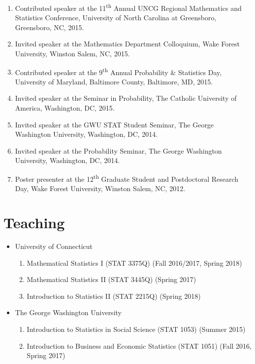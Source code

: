 \documentclass{res}
\begin{document}
\begin{resume}
\begin{enumerate}
	\item Contributed speaker at the 11\textsuperscript{th} Annual UNCG Regional Mathematics and Statistics Conference, University of North Carolina at Greensboro, Greensboro, NC, 2015.
	\item Invited speaker at the Mathematics Department Colloquium, Wake Forest University, Winston Salem, NC, 2015. 
	\item Contributed speaker at the 9\textsuperscript{th} Annual Probability \& Statistics Day, University of Maryland, Baltimore County, Baltimore, MD, 2015.
	\item Invited speaker at the Seminar in Probability, The Catholic University of America, Washington, DC, 2015.
	\item Invited speaker at the GWU STAT Student Seminar, The George Washington University, Washington, DC, 2014.
	\item Invited speaker at the Probability Seminar, The George Washington University, Washington, DC, 2014.
	\item Poster presenter at the 12\textsuperscript{th} Graduate Student and Postdoctoral Research Day, Wake Forest University, Winston Salem, NC, 2012.
\end{enumerate}

\section{Teaching}
\begin{itemize}
	\item University of Connecticut
	\begin{enumerate}
		\item Mathematical Statistics {\rm I} (STAT 3375Q) (Fall 
		2016/2017, Spring 2018)
		\item Mathematical Statistics {\rm II} (STAT 3445Q) (Spring 
		2017)
		\item Introduction to Statistics {\rm II} (STAT 2215Q) 
		(Spring 2018)
	\end{enumerate}
	\item The George Washington University
	\begin{enumerate}
		\item Introduction to Statistics in Social Science (STAT 
		1053) (Summer 2015)
		\item Introduction to Business and Economic Statistics 
		(STAT 1051) (Fall 2016, Spring 2017)
	\end{enumerate}
\end{itemize}


\end{resume}
\end{document}

